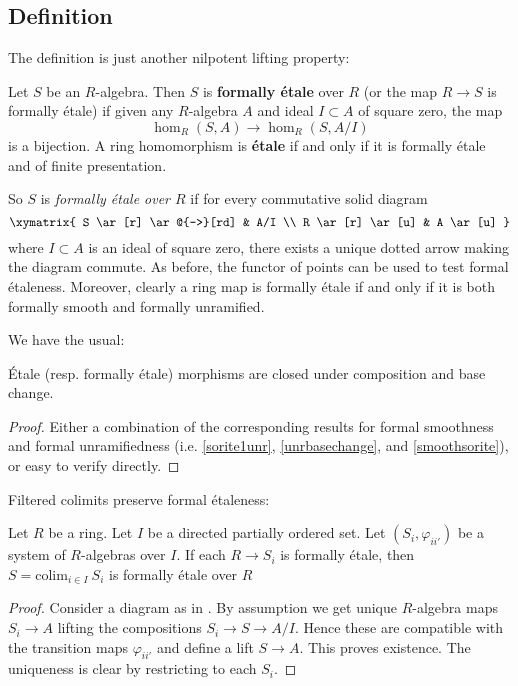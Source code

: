 \subsection{Definition}
The definition is just another nilpotent lifting property:
\begin{definition}
\label{definition-formally-etale}
Let $S$ be an $R$-algebra. Then $S$ is \textbf{formally \'etale} over $R$ (or
the map $R \to S$ is formally \'etale) if given any
$R$-algebra $A$ and ideal $I \subset A $ of square zero, the map
\[ \hom_R(S, A) \to \hom_R(S, A/I)\]
is a bijection.
A ring homomorphism is \textbf{\'etale} if and only if it is formally \'etale
and of finite presentation. 
\end{definition}

So $S$ is {\it formally \'etale over $R$} if for every
commutative solid diagram
$$
\xymatrix{
S \ar[r] \ar@{-->}[rd] & A/I \\
R \ar[r] \ar[u] & A \ar[u]
}
$$
where $I \subset A$ is an ideal of square zero, there exists
a unique dotted arrow making the diagram commute. As before, the functor
of points can be used to test formal \'etaleness.
Moreover, clearly a ring map is formally \'etale if and only if
it is both formally smooth and formally unramified.

We have the usual:
\begin{proposition} 
\'Etale (resp. formally \'etale) morphisms are closed under composition
and base change.
\end{proposition} 
\begin{proof} 
Either a combination of the corresponding results for formal
smoothness and formal unramifiedness (i.e.  \cref{sorite1unr}, 
\cref{unrbasechange}, and  \cref{smoothsorite}), or easy to verify
directly.
\end{proof} 

Filtered colimits preserve formal \'etaleness:
\begin{lemma}
\label{lemma-colimit-formally-etale}
Let $R$ be a ring. Let $I$ be a directed partially ordered set.
Let $(S_i, \varphi_{ii'})$ be a system of $R$-algebras
over $I$. If each $R \to S_i$ is formally \'etale, then
$S = \text{colim}_{i \in I}\ S_i$ is formally \'etale over $R$
\end{lemma}

\begin{proof}
Consider a diagram as in .
By assumption we get unique $R$-algebra maps $S_i \to A$ lifting
the compositions $S_i \to S \to A/I$. Hence these are compatible
with the transition maps $\varphi_{ii'}$ and define a lift
$S \to A$. This proves existence.
The uniqueness is clear by restricting to each $S_i$.
\end{proof}

